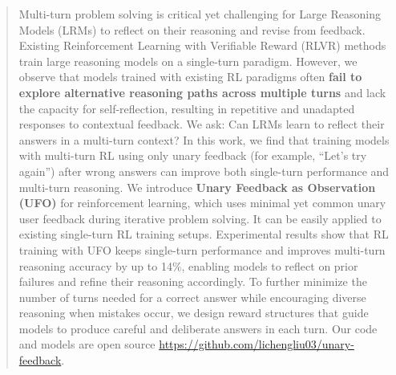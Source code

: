 \begin{abstract}
    Multi-turn problem solving is critical yet challenging for Large Reasoning Models (LRMs) to reflect on their reasoning and revise from feedback. Existing Reinforcement Learning with Verifiable Reward (RLVR) methods train large reasoning models on a single-turn paradigm. However, we observe that models trained with existing RL paradigms often \textbf{fail to explore alternative reasoning paths across multiple turns} and lack the capacity for self-reflection, resulting in repetitive and unadapted responses to contextual feedback.
    We ask: Can LRMs learn to reflect their answers in a multi-turn context? In this work, we find that training models with multi-turn RL using only unary feedback (for example, “Let’s try again”) after wrong answers can improve both single-turn performance and multi-turn reasoning. We introduce \textbf{Unary Feedback as Observation (UFO)} for reinforcement learning, which uses minimal yet common unary user feedback during iterative problem solving. It can be easily applied to existing single-turn RL training setups. Experimental results show that RL training with UFO keeps single-turn performance and improves multi-turn reasoning accuracy by up to 14\%, enabling models to reflect on prior failures and refine their reasoning accordingly. To further minimize the number of turns needed for a correct answer while encouraging diverse reasoning when mistakes occur, we design reward structures that guide models to produce careful and deliberate answers in each turn. Our code and models are open source \href{https://github.com/lichengliu03/unary-feedback}{https://github.com/lichengliu03/unary-feedback}.
\end{abstract}

